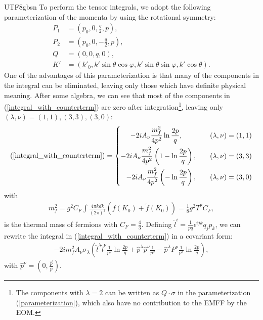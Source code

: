 \documentclass[11pt]{article}\def\baselinestretch{1.4}
\def\p{{\pi}}
\begin{document}
\begin{CJK}{UTF8}{gbsn}
To perform the tensor integrals, we adopt the following parameterization of the momenta by using the rotational symmetry:
\begin{align}
   P_1 &=(p_0, 0, \frac{q}{2}, p) ,\nonumber \\
   P_2 &=(p_0, 0, -\frac{q}{2}, p) ,\nonumber \\
   Q &=(0, 0, q, 0) ,\nonumber \\
   K' &=(k'_0, k' \sin{\theta } \cos{\varphi }, k' \sin{\theta } \sin{\varphi }, k' \cos{\theta }).\label{parameterization}
\end{align}
One of the advantages of this parameterization is that many of the components in the integral can be eliminated, leaving only those which have definite physical meaning.
After some algebra, we can see that most of the components in (\ref{integral_with_counterterm}) are zero after integration\footnote{The components with $\lambda = 2$ can be written as $Q\cdot \sigma$ in the parameterization (\ref{parameterization}), which also have no contribution to the EMFF by the EOM.  }, leaving only $(\lambda, \nu)=(1, 1), (3, 3), (3, 0)$: 
\begin{align}
(\ref{integral_with_counterterm}) = \left\{
\begin{aligned}
-2i A_\nu \frac{m_f^2}{4p^2}\ln{\frac{2p}{q}}, \quad\quad\quad\quad   & (\lambda,\nu)=(1,1)  \\
-2i A_\nu \frac{m_f^2}{4p^2}\left(1-\ln{\frac{2p}{q}}\right), \quad\quad   & (\lambda,\nu)=(3,3)  \\
-2i A_\nu \frac{m_f^2}{4p^2}\left(-\ln{\frac{2p}{q}}\right), \quad\quad   & (\lambda,\nu)=(3,0)
\end{aligned}
\right.
\end{align}
with
\begin{align}
m_f^2=g^2C_F\int\frac{4\p kdk}{(2\pi)^3}\left(f(K_0)+\tilde{f}(K_0)\right)=\frac{1}{8}g^2 T^2 C_F,
\end{align}
is the thermal mass of fermions with $C_F=\frac{4}{3}$.
Defining $\hat{l}^i=\frac{1}{pq}\epsilon^{ijk}q_j p_k$, we can rewrite the integral in (\ref{integral_with_counterterm}) in a covariant form:
\begin{align}
-2i m_f^2 A_\nu \sigma _\lambda \left( \hat{l}^\lambda \hat{l}^\nu \frac{1}{p^2}\ln{\frac{2p}{q}} + \hat{p}^\lambda \hat{p}^\nu \frac{1}{p^2} - \hat{p}^\lambda P^\nu \frac{1}{p^3}\ln{\frac{2p}{q}} \right), \label{vertex_without_thermal_mass}
\end{align}
with $\hat{p}^\nu = (0,\frac{\vec{p}}{p})$.%
 

\end{CJK}
\end{document}
